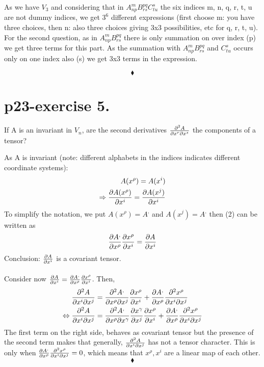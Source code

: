 As we have $V_{3}$ and considering that in $A^{m}_{np} B^{pq}_{rs}C^{s}_{tu}$ the six indices m, n, q, r, t, u are not dummy indices, we get $3^{6}$ different expressions (first choose m: you have three choices, then n: also three choices giving 3x3 possibilities, etc for q, r, t, u).\\
For the second question, as in $A^{m}_{np} B^{pq}_{rs}$ there is only summation on over index (p) we get three terms for this part. As the summation with $A^{m}_{np} B^{pq}_{rs}$ and $C^{s}_{tu}$ occurs only on one index also (s) we get 3x3 terms in the expression.

$$\blacklozenge$$
\pagebreak[4]

\section{p23-exercise 5.}
\begin{tcolorbox}
If A  is an invariant in $V_{n}$, are the second derivatives $\pdv{A}{x^{r}}{x^{s}}$ the components of a tensor?
\end{tcolorbox}

As A is invariant (note: different alphabets in the indices indicates different coordinate systems):
\begin{align}
\ A(x^{\rho}) = A(x^{i})\\
\Rightarrow \pdv{A(x^{\rho})}{x^{i}} = \pdv{A(x^{j})}{x^{i}}
\end{align}
To simplify the notation, we put $A(x^{\rho}) = A^{,}$ and $A(x^{j}) = A^{,}$ then (2) can be written as
\begin{align}
\pdv{A^{,}}{x^{\rho}}\pdv{x^{\rho}}{x^{i}} = \pdv{A}{x^{i}}
 \end{align}
 Conclusion: $\pdv{A}{x^{i}}$ is a covariant tensor. \\\\Consider now $\pdv{A}{x^{i}} = \pdv{A^{,}}{x^{\rho}}\pdv{x^{\rho}}{x^{i}}$. Then,
\begin{align}
\pdv{A}{x^{i}}{x^{j}} &= \pdv{A^{,}}{x^{\rho}}{x^{j}}\pdv{x^{\rho}}{x^{i}}+ \pdv{A^{,}}{x^{\rho}}\pdv{x^{\rho}}{x^{i}}{x^{j}}\\
\Leftrightarrow \pdv{A}{x^{i}}{x^{j}} &= \pdv{A^{,}}{x^{\rho}}{x^{\gamma}}\pdv{x^{\gamma}}{x^{j}}\pdv{x^{\rho}}{x^{i}}+ \pdv{A^{,}}{x^{\rho}}\pdv{x^{\rho}}{x^{i}}{x^{j}}
\end{align}
The first term on the right side, behaves as covariant tensor but the presence of the second term makes that generally, $\pdv{A}{x^{i}}{x^{j}}$ has not a tensor character. This is only when $\pdv{A^{,}}{x^{\rho}}\pdv{x^{\rho}}{x^{i}}{x^{j}}=0$, which means that $x^{\rho}, x^{i}$ are a linear map of each other.
$$\blacklozenge$$
\pagebreak[4]


